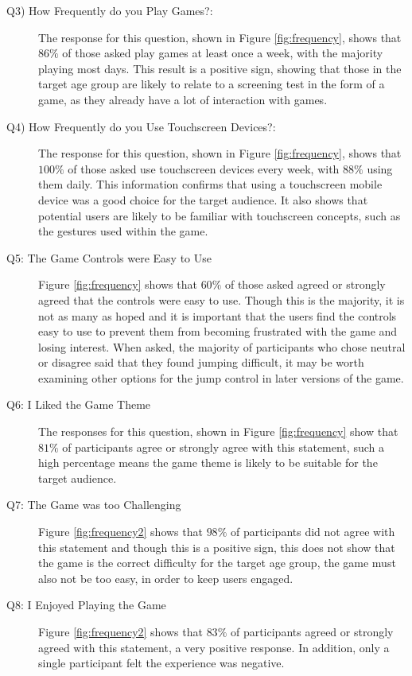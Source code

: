 \documentclass[journal]{IEEEtran}
\begin{document}
\begin{description}
\item[Q3) How Frequently do you Play Games?: ]
The response for this question, shown in Figure \ref{fig:frequency}, shows that $86\%$ of those asked play games at least once a week, with the majority playing most days. This result is a positive sign, showing that those in the target age group are likely to relate to a screening test in the form of a game, as they already have a lot of interaction with games.

\item[Q4) How Frequently do you Use Touchscreen Devices?:]
The response for this question, shown in Figure \ref{fig:frequency}, shows that $100\%$ of those asked use touchscreen devices every week, with $88\%$ using them daily. This information confirms that using a touchscreen mobile device was a good choice for the target audience. It also shows that potential users are likely to be familiar with touchscreen concepts, such as the gestures used within the game.

\item[Q5: The Game Controls were Easy to Use]
Figure \ref{fig:frequency} shows that $60\%$ of those asked agreed or strongly agreed that the controls were easy to use. Though this is the majority, it is not as many as hoped and it is important that the users find the controls easy to use to prevent them from becoming frustrated with the game and losing interest. When asked, the majority of participants who chose neutral or disagree said that they found jumping difficult, it may be worth examining other options for the jump control in later versions of the game.

\item[Q6: I Liked the Game Theme]
The responses for this question, shown in Figure \ref{fig:frequency} show that $81\%$ of participants agree or strongly agree with this statement, such a high percentage means the game theme is likely to be suitable for the target audience.

\item[Q7: The Game was too Challenging]
Figure \ref{fig:frequency2} shows that $98\%$ of participants did not agree with this statement and though this is a positive sign, this does not show that the game is the correct difficulty for the target age group, the game must also not be too easy, in order to keep users engaged.

\item[Q8: I Enjoyed Playing the Game]
Figure \ref{fig:frequency2} shows that $83\%$ of participants  agreed or strongly agreed with this statement, a very positive response. In addition, only a single participant felt the experience was negative. 


\end{description}
\end{document}
